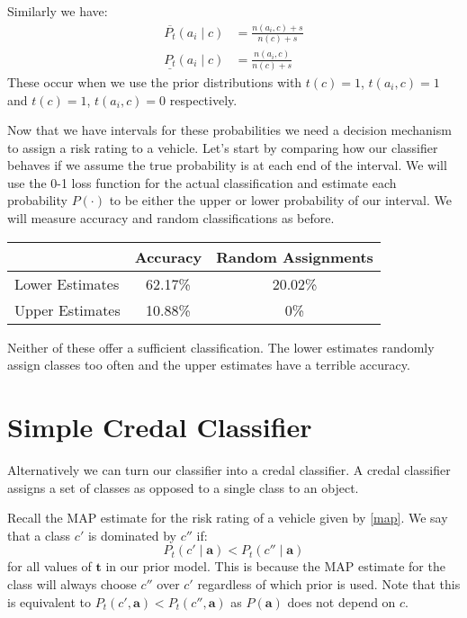 Similarly we have:
\begin{align}
	\overline{P_t}(a_i \mid c) & = \frac{n(a_i, c) + s}{n(c)+s} \\
	\underline{P_t}(a_i \mid c) & = \frac{n(a_i, c)}{n(c)+s}
\end{align}
These occur when we use the prior distributions with $t(c) = 1$, $t(a_i, c)=1$ and $t(c) = 1$, $t(a_i, c)=0$ respectively.

Now that we have intervals for these probabilities we need a decision mechanism to assign a risk rating to a vehicle.
Let's start by comparing how our classifier behaves if we assume the true probability is at each end of the interval.
We will use the 0-1 loss function for the actual classification and estimate each probability $P(\cdot)$ to be either the upper or lower probability of our interval.
We will measure accuracy and random classifications as before.

\begin{center}
	\begin{tabular}{l|c c}
	                & Accuracy & Random Assignments \\
	\hline
	Lower Estimates & 62.17\%  & 20.02\%            \\
	Upper Estimates & 10.88\%  & 0\%                \\
	\end{tabular}
\end{center}

Neither of these offer a sufficient classification.
The lower estimates randomly assign classes too often and the upper estimates have a terrible accuracy.

\section{Simple Credal Classifier}
Alternatively we can turn our classifier into a credal classifier.
A credal classifier assigns a set of classes as opposed to a single class to an object.

Recall the MAP estimate for the risk rating of a vehicle given by \cref{map}.
We say that a class $c'$ is dominated by $c''$ if:
\begin{equation}\label{Credal Dominance}
	P_t(c' \mid \mathbf{a}) < P_t(c'' \mid \mathbf{a})
\end{equation}
for all values of $\mathbf{t}$ in our prior model.
This is because the MAP estimate for the class will always choose $c''$ over $c'$ regardless of which prior is used.
Note that this is equivalent to $P_t(c', \mathbf{a}) < P_t(c'', \mathbf{a})$ as $P(\mathbf{a})$ does not depend on $c$.

